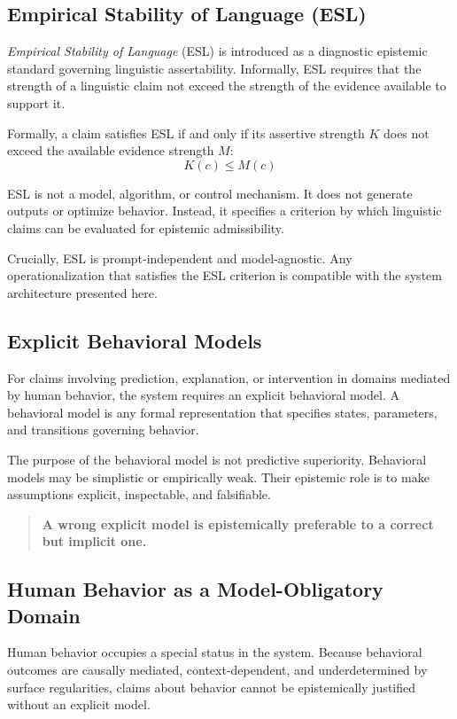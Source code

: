 \documentclass[11pt,a4paper]{article}
\begin{document}
\subsection{Empirical Stability of Language (ESL)}

\emph{Empirical Stability of Language} (ESL) is introduced as a diagnostic epistemic standard governing linguistic assertability. Informally, ESL requires that the strength of a linguistic claim not exceed the strength of the evidence available to support it.

Formally, a claim satisfies ESL if and only if its assertive strength $K$ does not exceed the available evidence strength $M$:
\[
K(c) \le M(c)
\]

ESL is not a model, algorithm, or control mechanism. It does not generate outputs or optimize behavior. Instead, it specifies a criterion by which linguistic claims can be evaluated for epistemic admissibility.

Crucially, ESL is prompt-independent and model-agnostic. Any operationalization that satisfies the ESL criterion is compatible with the system architecture presented here.

\subsection{Explicit Behavioral Models}

For claims involving prediction, explanation, or intervention in domains mediated by human behavior, the system requires an explicit behavioral model. A behavioral model is any formal representation that specifies states, parameters, and transitions governing behavior.

The purpose of the behavioral model is not predictive superiority. Behavioral models may be simplistic or empirically weak. Their epistemic role is to make assumptions explicit, inspectable, and falsifiable.

\begin{quote}
\textbf{A wrong explicit model is epistemically preferable to a correct but implicit one.}
\end{quote}

\subsection{Human Behavior as a Model-Obligatory Domain}

Human behavior occupies a special status in the system. Because behavioral outcomes are causally mediated, context-dependent, and underdetermined by surface regularities, claims about behavior cannot be epistemically justified without an explicit model.
\end{document}

